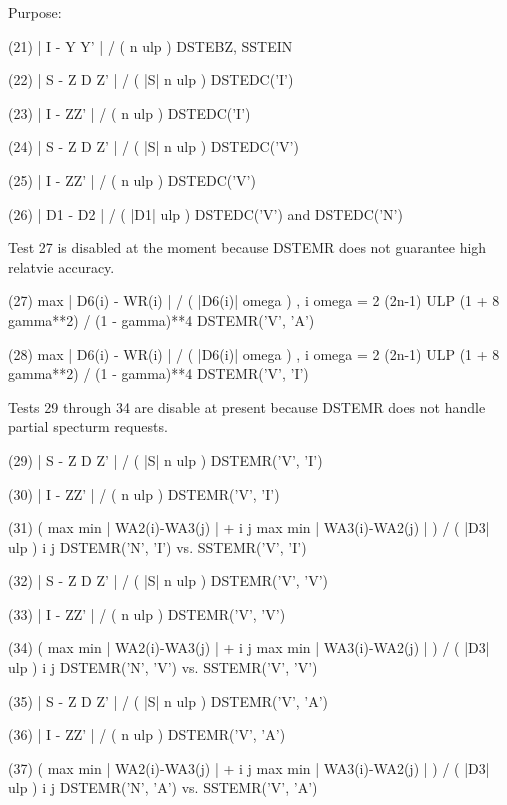 \begin{DoxyParagraph}{Purpose\+: }
\begin{DoxyVerb}
 (21)    | I - Y Y' | / ( n ulp )          DSTEBZ, SSTEIN

 (22)    | S - Z D Z' | / ( |S| n ulp )    DSTEDC('I')

 (23)    | I - ZZ' | / ( n ulp )           DSTEDC('I')

 (24)    | S - Z D Z' | / ( |S| n ulp )    DSTEDC('V')

 (25)    | I - ZZ' | / ( n ulp )           DSTEDC('V')

 (26)    | D1 - D2 | / ( |D1| ulp )           DSTEDC('V') and
                                              DSTEDC('N')

 Test 27 is disabled at the moment because DSTEMR does not
 guarantee high relatvie accuracy.

 (27)    max | D6(i) - WR(i) | / ( |D6(i)| omega ) ,
          i
         omega = 2 (2n-1) ULP (1 + 8 gamma**2) / (1 - gamma)**4
                                              DSTEMR('V', 'A')

 (28)    max | D6(i) - WR(i) | / ( |D6(i)| omega ) ,
          i
         omega = 2 (2n-1) ULP (1 + 8 gamma**2) / (1 - gamma)**4
                                              DSTEMR('V', 'I')

 Tests 29 through 34 are disable at present because DSTEMR
 does not handle partial specturm requests.

 (29)    | S - Z D Z' | / ( |S| n ulp )    DSTEMR('V', 'I')

 (30)    | I - ZZ' | / ( n ulp )           DSTEMR('V', 'I')

 (31)    ( max { min | WA2(i)-WA3(j) | } +
            i     j
           max { min | WA3(i)-WA2(j) | } ) / ( |D3| ulp )
            i     j
         DSTEMR('N', 'I') vs. SSTEMR('V', 'I')

 (32)    | S - Z D Z' | / ( |S| n ulp )    DSTEMR('V', 'V')

 (33)    | I - ZZ' | / ( n ulp )           DSTEMR('V', 'V')

 (34)    ( max { min | WA2(i)-WA3(j) | } +
            i     j
           max { min | WA3(i)-WA2(j) | } ) / ( |D3| ulp )
            i     j
         DSTEMR('N', 'V') vs. SSTEMR('V', 'V')

 (35)    | S - Z D Z' | / ( |S| n ulp )    DSTEMR('V', 'A')

 (36)    | I - ZZ' | / ( n ulp )           DSTEMR('V', 'A')

 (37)    ( max { min | WA2(i)-WA3(j) | } +
            i     j
           max { min | WA3(i)-WA2(j) | } ) / ( |D3| ulp )
            i     j
         DSTEMR('N', 'A') vs. SSTEMR('V', 'A')


\end{DoxyVerb}
\end{DoxyParagraph}
